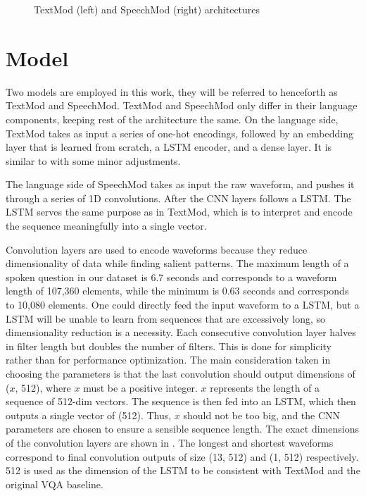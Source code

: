 \documentclass[letterpaper]{article} %
\begin{document}
\begin{figure}[t]
\caption{TextMod (left) and SpeechMod (right) architectures}
\label{fig:modarc}
\end{figure}

\section{Model}
Two models are employed in this work, they will be referred to henceforth as TextMod and SpeechMod. TextMod and SpeechMod only differ in their language components, keeping rest of the architecture the same. On the language side, TextMod takes as input a series of one-hot encodings, followed by an embedding layer that is learned from scratch, a LSTM encoder, and a dense layer. It is similar to \cite{VQA} with some minor adjustments.

The language side of SpeechMod takes as input the raw waveform, and pushes it through a series of 1D convolutions. After the CNN layers follows a LSTM. The LSTM serves the same purpose as in TextMod, which is to interpret and encode the sequence meaningfully into a single vector.

Convolution layers are used to encode waveforms because they reduce dimensionality of data while finding salient patterns. The maximum length of a spoken question in our dataset is 6.7 seconds and corresponds to a waveform length of 107,360 elements, while the minimum is 0.63 seconds and corresponds to 10,080 elements. One could directly feed the input waveform to a LSTM, but a LSTM will be unable to learn from sequences that are excessively long, so dimensionality reduction is a necessity. Each consecutive convolution layer halves in filter length but doubles the number of filters. This is done for simplicity rather than for performance optimization. The main consideration taken in choosing the parameters is that the last convolution should output dimensions of ($x$, 512), where $x$ must be a positive integer. $x$ represents the length of a sequence of 512-dim vectors. The sequence is then fed into an LSTM, which then outputs a single vector of (512). Thus, $x$ should not be too big, and the CNN parameters are chosen to ensure a sensible sequence length. The exact dimensions of the convolution layers are shown in . The longest and shortest waveforms correspond to final convolution outputs of size (13, 512) and (1, 512) respectively. 512 is used as the dimension of the LSTM to be consistent with TextMod and the original VQA baseline.
\end{document}
